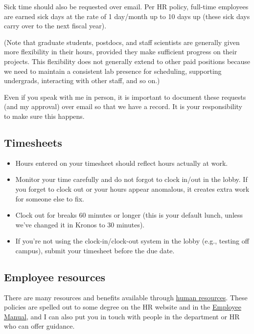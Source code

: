 \documentclass[letterpaper,12pt,oneside]{memoir}
\begin{document}
Sick time should also be requested over email. Per HR policy, full-time employees are earned sick days at the rate of 1 day/month up to 10 days up (these sick days carry over to the next fiscal year).

(Note that graduate students, postdocs, and staff scientists are generally given more flexibility in their hours, provided they make sufficient progress on their projects. This flexibility does not generally extend to other paid positions because we need to maintain a consistent lab presence for scheduling, supporting undergrads, interacting with other staff, and so on.)

\begin{shaded}
\noindent Even if you speak with me in person, it is important to document these requests (and my approval) over email so that we have a record. It is your responsibility to make sure this happens.
\end{shaded}

\subsection{Timesheets}

\begin{itemize}
\item Hours entered on your timesheet should reflect hours actually at work.
\item Monitor your time carefully and do not forgot to clock in/out in the lobby. If you forget to clock out or your hours appear anomalous, it creates extra work for someone else to fix. 
\item Clock out for breaks 60 minutes or longer (this is your default lunch, unless we've changed it in Kronos to 30 minutes).
\item If you're not using the clock-in/clock-out system in the lobby (e.g., testing off campus), submit your timesheet before the due date.
\end{itemize}


\subsection{Employee resources}

There are many resources and benefits available through \href{https://www.temple.edu/faculty-and-staff/working-temple/human-resources}{human resources}. These policies are spelled out to some degree on the HR website and in the \href{http://www.temple.edu/hr/departments/employeerelations/documents/Employee_Manual_Feb_2016.pdf}{Employee Manual}, and I can also put you in touch with people in the department or HR who can offer guidance.
\end{document}
